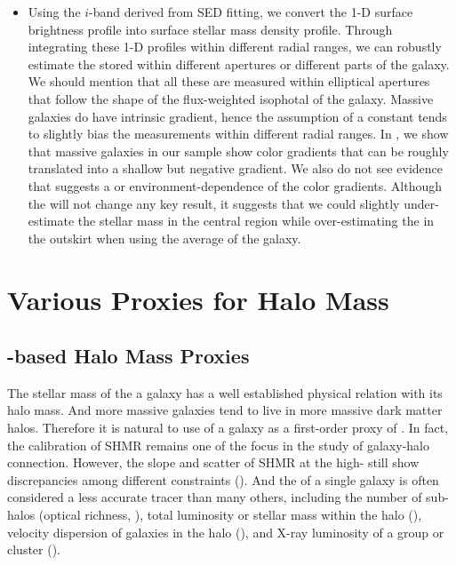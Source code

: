 \documentclass[a4paper,fleqn,usenatbib]{mnras}
\begin{document}
\begin{itemize}
		\item Using the $i$-band \mlratio{} derived from SED fitting, we convert the
			1-D surface brightness profile into surface stellar mass density profile.
            Through integrating these 1-D profiles within different radial ranges, we
            can robustly estimate the \mstar{} stored within different apertures or
            different parts of the galaxy.
            We should mention that all these \mstar{} are measured within elliptical
            apertures that follow the shape of the flux-weighted isophotal of the galaxy.
            Massive galaxies do have intrinsic \mlratio{} gradient, hence the assumption of
            a constant \mlratio{} tends to slightly bias the \mstar{} measurements within
            different radial ranges.
            In \citet{Huang2018b}, we show that massive galaxies in our sample show
            color gradients that can be roughly translated into a shallow but negative
            \mlratio{} gradient.
            We also do not see evidence that suggests a \mstar{} or environment-dependence
            of the color gradients.
            Although the \mlratio{} will not change any key result, it suggests that we
            could slightly under-estimate the stellar mass in the central region while
            over-estimating the \mstar{} in the outskirt when using the average \mlratio{}
            of the galaxy.

	\end{itemize}


\section{Various Proxies for Halo Mass}

\subsection{\mstar{}-based Halo Mass Proxies}
    \label{sec:proxy_mstar}

    The stellar mass of the a galaxy has a well established physical relation with its halo mass.
    And more massive galaxies tend to live in more massive dark matter halos.
    Therefore it is natural to use \mstar{} of a galaxy as a first-order proxy of \mvir{}.
    In fact, the calibration of SHMR remains one of the focus in the study of galaxy-halo connection.
    However, the slope and scatter of SHMR at the high-\mstar{} still show discrepancies among
    different constraints (\addref{}).
    And the \mstar{} of a single galaxy is often considered a less accurate \mvir{} tracer
    than many others, including the number of sub-halos (optical richness, \addref{}),
    total luminosity or stellar mass within the halo (\addref{}), velocity dispersion of galaxies
    in the halo (\addref{}), and X-ray luminosity of a group or cluster (\addref{}).
\end{document}
